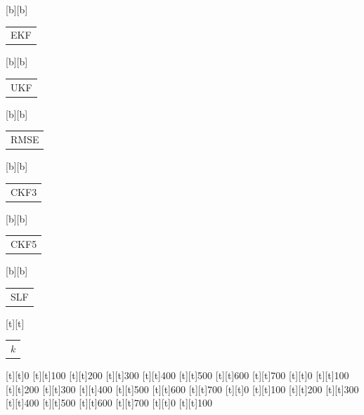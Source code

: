 %    
%
%
\begin{psfrags}%
\psfragscanon%
%
[b][b]{\color[rgb]{0,0,0}\setlength{\tabcolsep}{0pt}\begin{tabular}{c}EKF\end{tabular}}%
[b][b]{\color[rgb]{0,0,0}\setlength{\tabcolsep}{0pt}\begin{tabular}{c}UKF\end{tabular}}%
[b][b]{\color[rgb]{0,0,0}\setlength{\tabcolsep}{0pt}\begin{tabular}{c}RMSE\end{tabular}}%
[b][b]{\color[rgb]{0,0,0}\setlength{\tabcolsep}{0pt}\begin{tabular}{c}CKF3\end{tabular}}%
[b][b]{\color[rgb]{0,0,0}\setlength{\tabcolsep}{0pt}\begin{tabular}{c}CKF5\end{tabular}}%
[b][b]{\color[rgb]{0,0,0}\setlength{\tabcolsep}{0pt}\begin{tabular}{c}SLF\end{tabular}}%
[t][t]{\color[rgb]{0,0,0}\setlength{\tabcolsep}{0pt}\begin{tabular}{c}$k$\end{tabular}}%
%
[t][t]{0}%
[t][t]{100}%
[t][t]{200}%
[t][t]{300}%
[t][t]{400}%
[t][t]{500}%
[t][t]{600}%
[t][t]{700}%
[t][t]{0}%
[t][t]{100}%
[t][t]{200}%
[t][t]{300}%
[t][t]{400}%
[t][t]{500}%
[t][t]{600}%
[t][t]{700}%
[t][t]{0}%
[t][t]{100}%
[t][t]{200}%
[t][t]{300}%
[t][t]{400}%
[t][t]{500}%
[t][t]{600}%
[t][t]{700}%
[t][t]{0}%
[t][t]{100}%

\end{psfrags}
